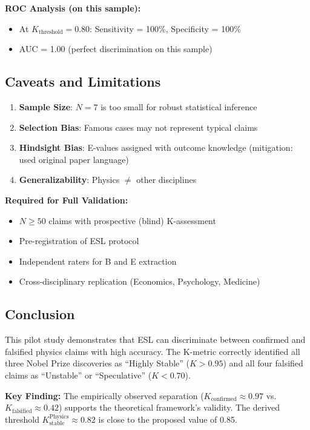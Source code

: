 \documentclass[11pt,a4paper]{article}
\begin{document}
\textbf{ROC Analysis (on this sample):}
\begin{itemize}
    \item At $K_{\text{threshold}} = 0.80$: Sensitivity = 100\%, Specificity = 100\%
    \item AUC = 1.00 (perfect discrimination on this sample)
\end{itemize}

\subsection{Caveats and Limitations}

\begin{enumerate}
    \item \textbf{Sample Size}: $N = 7$ is too small for robust statistical inference
    \item \textbf{Selection Bias}: Famous cases may not represent typical claims
    \item \textbf{Hindsight Bias}: E-values assigned with outcome knowledge (mitigation: used original paper language)
    \item \textbf{Generalizability}: Physics $\neq$ other disciplines
\end{enumerate}

\textbf{Required for Full Validation:}
\begin{itemize}
    \item $N \geq 50$ claims with prospective (blind) K-assessment
    \item Pre-registration of ESL protocol
    \item Independent raters for B and E extraction
    \item Cross-disciplinary replication (Economics, Psychology, Medicine)
\end{itemize}

\subsection{Conclusion}

This pilot study demonstrates that ESL can discriminate between confirmed and falsified physics claims with high accuracy. The K-metric correctly identified all three Nobel Prize discoveries as ``Highly Stable'' ($K > 0.95$) and all four falsified claims as ``Unstable'' or ``Speculative'' ($K < 0.70$).

\textbf{Key Finding:} The empirically observed separation ($K_{\text{confirmed}} \approx 0.97$ vs. $K_{\text{falsified}} \approx 0.42$) supports the theoretical framework's validity. The derived threshold $K_{\text{stable}}^{\text{Physics}} \approx 0.82$ is close to the proposed value of 0.85.
\end{document}
